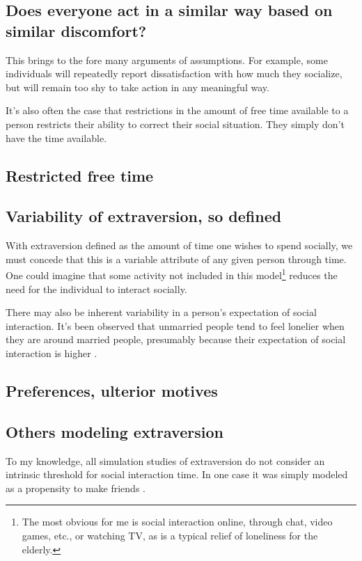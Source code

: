 \documentclass[]{article}
\begin{document}
	\subsection{Does everyone act in a similar way based on similar discomfort?}
	This brings to the fore many arguments of assumptions. 
	For example, some individuals will repeatedly report dissatisfaction with how much they socialize, but will remain too shy to take action in any meaningful way.
	
	It's also often the case that restrictions in the amount of free time available to a person restricts their ability to correct their social situation. They simply don't have the time available.
	
	\subsection{Restricted free time}
	
	\subsection{Variability of extraversion, so defined}
	With extraversion defined as the amount of time one wishes to spend socially, we must concede that this is a variable attribute of any given person through time. One could imagine that some activity not included in this model\footnote{The most obvious for me is social interaction online, through chat, video games, etc., or watching TV, as is a typical relief of loneliness for the elderly.} reduces the need for the individual to interact socially.
	
	There may also be inherent variability in a person's expectation of social interaction. It's been observed that unmarried people tend to feel lonelier when they are around married people, presumably because their expectation of social interaction is higher \cite[p.~230]{Derlega1986}.
	
	\subsection{Preferences, ulterior motives}
	
	\subsection{Others modeling extraversion}
	To my knowledge, all simulation studies of extraversion do not consider an intrinsic threshold for social interaction time. In one case it was simply modeled as a propensity to make friends \cite{Muthukrishna}.
	
\end{document}
